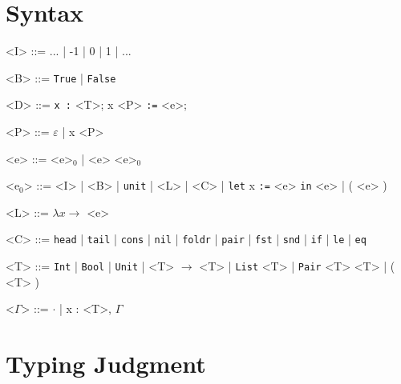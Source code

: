\documentclass[10pt]{article}
\newcommand{\ttt}[1]{\texttt{#1}}
\newcommand{\ra}{\ensuremath{\rightarrow}}
\newcommand{\head}{\ttt{head}}
\newcommand{\tail}{\ttt{tail}}
\newcommand{\cons}{\ttt{cons}}
\newcommand{\nil}{\ttt{nil}}
\newcommand{\foldr}{\ttt{foldr}}
\newcommand{\pair}{\ttt{pair}}
\newcommand{\fst}{\ttt{fst}}
\newcommand{\snd}{\ttt{snd}}
\newcommand{\ite}{\ttt{if}}
\newcommand{\letbnd}{\ttt{let}}
\newcommand{\inexpr}{\ttt{in}}
\newcommand{\lesseq}{\ttt{le}}
\newcommand{\eq}{\ttt{eq}}
\begin{document}
\section{Syntax}

\begin{grammar}
  <I> ::= ... | -1 | 0 | 1 | ...

  <B> ::= \ttt{True} | \ttt{False}

  <D> ::= \ttt{x :} <T>; x <P> \ttt{:=} <e>;

  <P> ::= $\varepsilon$ | x <P>

  <e> ::= <e>$_0$ | <e> <e>$_0$

  <e$_0$> ::= <I> | <B> | \ttt{unit} | <L> | <C> | \letbnd\; x \ttt{:=} <e> \inexpr\; <e> | ( <e> )

  <L> ::= $\lambda x \ra$ <e>

  <C> ::= \head\; | \tail\; | \cons\; | \nil\; | \foldr\; | \pair\; | \fst\; | \snd\; | \ite\; | \lesseq\; | \eq

  <T> ::= \ttt{Int} | \ttt{Bool} | \ttt{Unit} | <T> $\ra$ <T> | \ttt{List} <T> | \ttt{Pair} <T> <T> | ( <T> )

  <$\Gamma$> ::= $\cdot$ | x : <T>, $\Gamma$
\end{grammar}

\section{Typing Judgment}
\end{document}
